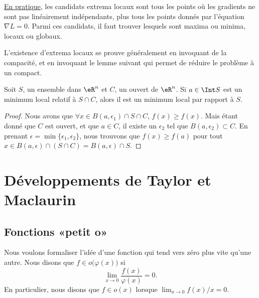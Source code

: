 \href{http://www.sagenb.org/home/pub/353/}{En pratique}, les candidats extrema locaux sont tous les points où les gradients ne sont pas linéairement indépendants, plus tous les points donnés par l'équation $\nabla L=0$. Parmi ces candidats, il faut trouver lesquels sont maxima ou minima, locaux ou globaux.

L'existence d'extrema locaux se prouve généralement en invoquant de la compacité, et en invoquant le lemme suivant qui permet de réduire le problème à un compact.

\begin{lemma}		\label{LemmeMinSCimpliqueS}
	Soit $S$, un ensemble dans $\eR^n$ et $C$, un ouvert de $\eR^n$. Si $a\in\Int S$ est un minimum local relatif à $S\cap C$, alors il est un minimum local par rapport à $S$.
\end{lemma}

\begin{proof}
	Nous avons que $\forall x\in B(a,\epsilon_1)\cap S\cap C$, $f(x)\geq f(x)$. Mais étant donné que $C$ est ouvert, et que $a\in C$, il existe un $\epsilon_2$ tel que $B(a,\epsilon_2)\subset C$. En prenant $\epsilon=\min\{ \epsilon_1,\epsilon_2 \}$, nous trouvons que $f(x)\geq f(a)$ pour tout $x\in B(a,\epsilon)\cap(S\cap C)=B(a,\epsilon)\cap S$.
\end{proof}



                    \section{Développements de Taylor et Maclaurin}

\subsection{Fonctions «petit o» }

Nous voulons formaliser l'idée d'une fonction qui tend vers zéro \og plus vite\fg{} qu'une autre. Nous disons que $f\in o\big(\varphi(x)\big)$ si
\begin{equation}
    \lim_{x\to 0} \frac{ f(x) }{ \varphi(x) }=0.
\end{equation}
En particulier, nous disons que $f\in o(x)$ lorsque $\lim_{x\to 0} f(x)/x=0$.

